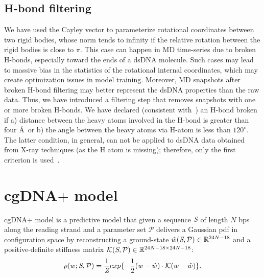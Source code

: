 \subsection{H-bond filtering}\label{c2:sec3sb2}
We have used the Cayley vector to parameterize rotational coordinates between two rigid bodies, whose norm tends to infinity if the relative rotation between the rigid bodies is close to $\pi$. 
This case can happen in MD time-series due to broken H-bonds, especially toward the ends of a dsDNA molecule.
Such cases may lead to massive bias in the statistics of the rotational internal coordinates, which may create optimization issues in model training.
Moreover, MD snapshots after broken H-bond filtering may better represent the dsDNA properties than the raw data. 
Thus, we have introduced a filtering step that removes snapshots with one or more broken H-bonds.
We have declared (consistent with~\cite{cgDNA1,petkevivciute2014cgdna,lankavs2009parameterization,3dna}) an H-bond broken if a) distance between the heavy atoms involved in the H-bond is greater than four \AA \ or b) the angle between the heavy atoms via H-atom is less than $120^\circ$. 
The latter condition, in general, can not be applied to dsDNA data obtained from X-ray techniques (as the H atom is missing); therefore, only the first criterion is used~\cite{3dna}.
\section{cgDNA$+$ model}\label{c2:sec3}
cgDNA$+$ model is a predictive model that given a sequence ${\textit{S}}$ of length $N$ bps along the reading strand and a parameter set $\mathcal{P}$ delivers a Gaussian pdf in configuration space by reconstructing a ground-state $\hat{w} ({\textit{S}}, \mathcal{P}) \in {\mathbb R}^{24N-18}$ and a positive-definite stiffness matrix ${\mathcal K} ({\textit{S}}, \mathcal{P}) \in {\mathbb R}^{24N-18 \times 24N-18}$:
\begin{equation}
\rho(w; {\textit{S}}, \mathcal{P}) = \frac{1}{\textit{Z}} exp \{-\frac{1}{2}(w-\hat{w})\cdot {\mathcal K} (w-\hat{w})\}.
\label{c2:eq8}
\end{equation}

